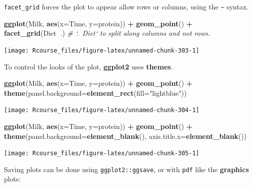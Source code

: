 \documentclass[]{book}
\newenvironment{Shaded}{\begin{snugshade}}{\end{snugshade}}
\newcommand{\CommentTok}[1]{\textcolor[rgb]{0.56,0.35,0.01}{\textit{#1}}}
\newcommand{\DataTypeTok}[1]{\textcolor[rgb]{0.13,0.29,0.53}{#1}}
\newcommand{\KeywordTok}[1]{\textcolor[rgb]{0.13,0.29,0.53}{\textbf{#1}}}
\newcommand{\NormalTok}[1]{#1}
\newcommand{\OperatorTok}[1]{\textcolor[rgb]{0.81,0.36,0.00}{\textbf{#1}}}
\newcommand{\StringTok}[1]{\textcolor[rgb]{0.31,0.60,0.02}{#1}}
\theoremstyle{definition}
\theoremstyle{definition}
\theoremstyle{definition}
\theoremstyle{remark}
\begin{document}
\texttt{facet\_grid} forces the plot to appear allow rows or columns, using the \texttt{\textasciitilde{}} syntax.

\begin{Shaded}
\begin{Highlighting}[]
\KeywordTok{ggplot}\NormalTok{(Milk, }\KeywordTok{aes}\NormalTok{(}\DataTypeTok{x=}\NormalTok{Time, }\DataTypeTok{y=}\NormalTok{protein)) }\OperatorTok{+}
\StringTok{  }\KeywordTok{geom_point}\NormalTok{() }\OperatorTok{+}
\StringTok{  }\KeywordTok{facet_grid}\NormalTok{(Diet}\OperatorTok{~}\NormalTok{.) }\CommentTok{# `.~Diet` to split along columns and not rows.}
\end{Highlighting}
\end{Shaded}

\texttt{[image: Rcourse\_files/figure-latex/unnamed-chunk-303-1]}

To control the looks of the plot, \textbf{ggplot2} uses \textbf{themes}.

\begin{Shaded}
\begin{Highlighting}[]
\KeywordTok{ggplot}\NormalTok{(Milk, }\KeywordTok{aes}\NormalTok{(}\DataTypeTok{x=}\NormalTok{Time, }\DataTypeTok{y=}\NormalTok{protein)) }\OperatorTok{+}
\StringTok{  }\KeywordTok{geom_point}\NormalTok{() }\OperatorTok{+}
\StringTok{  }\KeywordTok{theme}\NormalTok{(}\DataTypeTok{panel.background=}\KeywordTok{element_rect}\NormalTok{(}\DataTypeTok{fill=}\StringTok{"lightblue"}\NormalTok{))}
\end{Highlighting}
\end{Shaded}

\texttt{[image: Rcourse\_files/figure-latex/unnamed-chunk-304-1]}

\begin{Shaded}
\begin{Highlighting}[]
\KeywordTok{ggplot}\NormalTok{(Milk, }\KeywordTok{aes}\NormalTok{(}\DataTypeTok{x=}\NormalTok{Time, }\DataTypeTok{y=}\NormalTok{protein)) }\OperatorTok{+}
\StringTok{  }\KeywordTok{geom_point}\NormalTok{() }\OperatorTok{+}
\StringTok{  }\KeywordTok{theme}\NormalTok{(}\DataTypeTok{panel.background=}\KeywordTok{element_blank}\NormalTok{(),}
        \DataTypeTok{axis.title.x=}\KeywordTok{element_blank}\NormalTok{())}
\end{Highlighting}
\end{Shaded}

\texttt{[image: Rcourse\_files/figure-latex/unnamed-chunk-305-1]}

Saving plots can be done using \texttt{ggplot2::ggsave}, or with \texttt{pdf} like the \textbf{graphics} plots:
\end{document}
